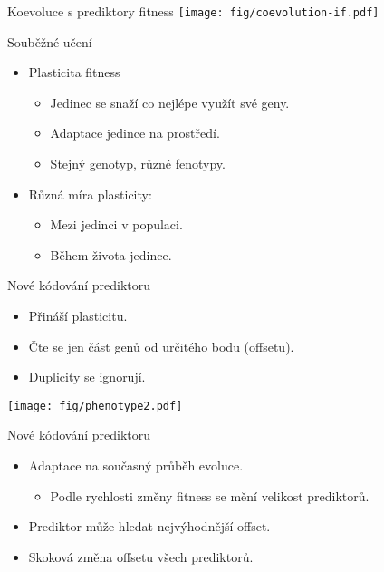 \documentclass[14pt]{beamer}
\begin{document}
\begin{frame}{Koevoluce s prediktory fitness}
    \center\texttt{[image: fig/coevolution-if.pdf]}
\end{frame}


\begin{frame}{Souběžné učení}
    \begin{itemize}
        \item Plasticita fitness
        \begin{itemize}
            \item Jedinec se snaží co nejlépe využít své geny.
            \item Adaptace jedince na prostředí.
            \item Stejný genotyp, různé fenotypy.
        \end{itemize}

        \item Různá míra plasticity:
        \begin{itemize}
            \item Mezi jedinci v populaci.
            \item Během života jedince.
        \end{itemize}
    \end{itemize}
\end{frame}


\begin{frame}{Nové kódování prediktoru}
    \begin{itemize}
        \item Přináší plasticitu.
        \item Čte se jen část genů od určitého bodu (offsetu).
        \item Duplicity se ignorují.
    \end{itemize}

    \vspace{0.75cm}
    \texttt{[image: fig/phenotype2.pdf]}
\end{frame}


\begin{frame}{Nové kódování prediktoru}
    \begin{itemize}
        \item Adaptace na současný průběh evoluce.
        \begin{itemize}
            \item Podle rychlosti změny fitness se mění velikost prediktorů.
        \end{itemize}
        \item Prediktor může hledat nejvýhodnější offset.
        \item Skoková změna offsetu všech prediktorů.
    \end{itemize}
\end{frame}
\end{document}
